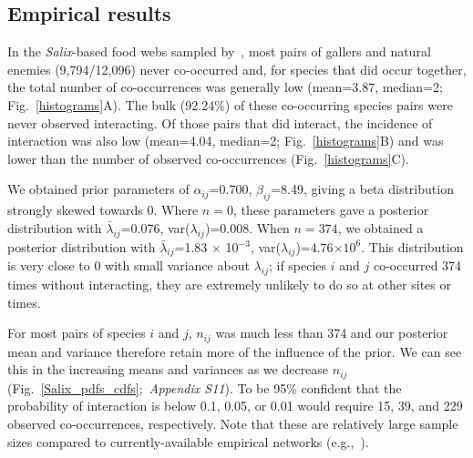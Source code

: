 \documentclass[12pt]{article}
\begin{document}
\begin{spacing}{1.5}
\subsection*{Empirical results}

  In the \emph{Salix}-based food webs sampled by~\citet{Kopelke2017}, most pairs of gallers and natural enemies (9,794/12,096) never co-occurred and, for species that did occur together, the total number of co-occurrences was generally low (mean=3.87, median=2; Fig.~\ref{histograms}A). The bulk (92.24\%) of these co-occurring species pairs were never observed interacting. Of those pairs that did interact, the incidence of interaction was also low (mean=4.04, median=2; Fig.~\ref{histograms}B) and was lower than the number of observed co-occurrences (Fig.~\ref{histograms}C).


  We obtained prior parameters of $\alpha_{ij}$=0.700, $\beta_{ij}$=8.49, giving a beta distribution strongly skewed towards 0. Where $n=0$, these parameters gave a posterior distribution with $\bar\lambda_{ij}$=0.076, var($\lambda_{ij}$)=0.008. When $n=374$, we obtained a posterior distribution with $\bar\lambda_{ij}$=1.83 $\times$ 10$^{-3}$, var($\lambda_{ij}$)=4.76$\times10^6$. This distribution is very close to 0 with small variance about $\lambda_{ij}$; if species $i$ and $j$ co-occurred 374 times without interacting, they are extremely unlikely to do so at other sites or times. 


  For most pairs of species $i$ and $j$, $n_{ij}$ was much less than 374 and our posterior mean and variance therefore retain more of the influence of the prior. We can see this in the increasing means and variances as we decrease $n_{ij}$ (Fig.~\ref{Salix_pdfs_cdfs};~\emph{Appendix S11}). To be 95\% confident that the probability of interaction is below 0.1, 0.05, or 0.01 would require 15, 39, and 229 observed co-occurrences, respectively. Note that these are relatively large sample sizes compared to currently-available empirical networks (e.g.,~\citealp{Morris2014}).




\end{spacing}
\end{document}
